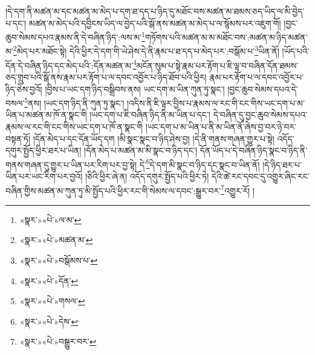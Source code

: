 །དེ་དག་ནི་མཚན་མ་དང་མཚན་མ་མེད་པ་དག་ཐ་དད་པ་ཉིད་དུ་མཐོང་བས་མཚན་མ་ཐམས་ཅད་ཡིད་ལ་མི་བྱེད་པ་དང་། མཚན་མ་མེད་པའི་དབྱིངས་ཡིད་ལ་བྱེད་པའི་སྒོ་ནས་མཚན་མ་མེད་པ་ལ་སྙོམས་པར་འཇུག་གོ། །བྱང་ཆུབ་སེམས་དཔའ་རྣམས་ནི་དེ་བཞིན་ཉིད་:ལས་མ་\footnote{«སྣར་»«པེ་»ལ་མ་}གཏོགས་པའི་མཚན་མ་མ་མཐོང་བས་:མཚན་མ་ཉིད་མཚན་མ་\footnote{«སྣར་»«པེ་»མཚན་མ་}མེད་པར་མཐོང་སྟེ། དེའི་ཕྱིར་དེ་དག་གི་ཡེ་ཤེས་དེ་ནི་རྣམ་པ་ཐ་དད་པ་མེད་པར་:བསྒོམ་པ་\footnote{«སྣར་»«པེ་»བསྒོམས་པ་}ཡིན་ནོ། །ཡོད་པའི་དོན་དེ་བཞིན་ཉིད་དང་མེད་པའི་:དོན་མཚན་མ་\footnote{«སྣར་»«པེ་»དོན་}མངོན་སུམ་པ་སྟེ་རྣམ་པར་རྟོག་པ་ཇི་ལྟ་བ་བཞིན་དོན་ཐམས་ཅད་གྲུབ་པའི་སྒོ་ནས་རྣམ་པར་རྟོག་པ་ལ་དབང་འབྱོར་པ་ཉིད་ཐོབ་པའི་ཕྱིར། རྣམ་པར་རྟོག་པ་ལ་དབང་འབྱོར་པ་ཉིད་ཅེས་བྱའོ། །བྱིས་པ་ཡང་དག་ཉིད་བསྒྲིབས་ནས། ཡང་དག་མ་ཡིན་ཀུན་ཏུ་སྣང་། །བྱང་ཆུབ་སེམས་དཔའ་དེ་བསལ་\footnote{«སྣར་»«པེ་»གསལ་}ནས། །ཡང་དག་ཉིད་ནི་ཀུན་ཏུ་སྣང་། །འདིས་ནི་ཇི་ལྟར་བྱིས་པ་རྣམས་ལ་རང་གི་ངང་གིས་ཡང་དག་པ་མ་ཡིན་པ་མཚན་མ་ཁོ་ན་སྣང་གི །ཡང་དག་པ་ཇི་བཞིན་ཉིད་ནི་མ་ཡིན་པ་དང་། དེ་བཞིན་དུ་བྱང་ཆུབ་སེམས་དཔའ་རྣམས་ལ་རང་གི་ངང་གིས་ཡང་དག་པ་ཁོ་ན་སྣང་གི །ཡང་དག་པ་མ་ཡིན་པ་ནི་མ་ཡིན་ནོ་ཞེས་བྱ་བར་ཉེ་བར་བསྟན་ཏོ། །དོན་མེད་པ་དང་དོན་ཡོད་དག །མི་སྣང་སྣང་བ་ཉིད་ཤེས་བྱ། །དེ་ནི་གནས་གཞན་གྱུར་པ་སྟེ། འདོད་དགུར་སྤྱོད་ཕྱིར་ཐར་པ་ཡིན། །དོན་མེད་པ་མཚན་མ་མི་སྣང་བ་ཉིད་དང་། དོན་ཡོད་པ་དེ་བཞིན་ཉིད་སྣང་བ་ཉིད་ནི་གནས་གཞན་དུ་གྱུར་པ་ཡིན་པར་རིག་པར་བྱ་སྟེ། དེ་\footnote{«སྣར་»«པེ་»དེས་}དེ་དག་མི་སྣང་བ་ཉིད་དང་སྣང་བ་ཡིན་ནོ། །དེ་ཉིད་ཐར་པ་ཡིན་པར་ཡང་རིག་པར་བྱའོ། །ཅིའི་ཕྱིར་ཞེ་ན། འདོད་དགུར་སྤྱོད་པའི་ཕྱིར་ཏེ། དེའི་ཚེ་རང་དབང་དུ་འགྱུར་ཞིང་རང་བཞིན་གྱིས་མཚན་མ་ཀུན་ཏུ་མི་སྤྱོད་པའི་ཕྱིར་རང་གི་སེམས་ལ་དབང་:སྒྱུར་བར་\footnote{«སྣར་»«པེ་»བསྒྱུར་བར་}འགྱུར་རོ། །
